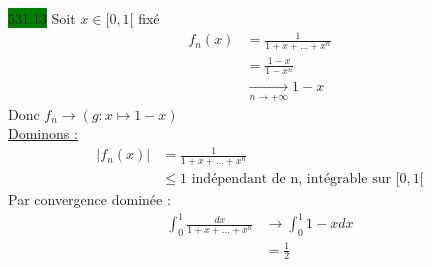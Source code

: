 \documentclass{article}
\begin{document}
\noindent \colorbox{green}{531.13}
Soit \(x \in [0,1[\) fixé\\
\begin{align*}
  f_{n}(x) &= \frac{1}{1 + x + \dots + x^{n}}\\
           &= \frac{1-x}{1-x^{n}}\\
           &\xrightarrow[n \to +\infty]{} 1-x
\end{align*}
Donc \(f_{n} \rightarrow (g:x \mapsto 1-x)\)\\
\underline{Dominons :}\\
\begin{align*}
  |f_{n}(x)| &= \frac{1}{1+x+\dots+x^{n}}\\
             &\leq 1 \text{ indépendant de n, intégrable sur }[0, 1[
\end{align*}
Par convergence dominée : 
\begin{align*}
  \int_{0}^{1} \frac{dx}{1+x+\dots+x^{n}} &\rightarrow \int_{0}^{1}1-x dx \\
    &= \frac{1}{2}
\end{align*}
\end{document}
